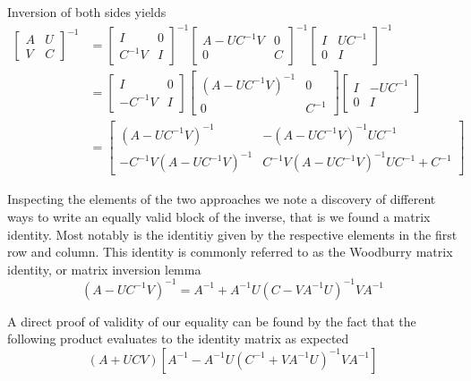 \documentclass{article}
\begin{document}
Inversion of both sides yields
\begin{align*}
\left[ \begin{array}{cc}{A} & {U} \\ {V} & {C}\end{array}\right]^{-1}&=\left[ \begin{array}{cc}{I} & {0} \\ {C^{-1} V} & {I}\end{array}\right]^{-1} \left[ \begin{array}{cc}{A-U C^{-1} V} & {0} \\ {0} & {C}\end{array}\right]^{-1} \left[ \begin{array}{cc}{I} & {U C^{-1}} \\ {0} & {I}\end{array}\right]^{-1} \\
&=\left[ \begin{array}{cc}{I} & {0} \\ {-C^{-1} V} & {I}\end{array}\right] \left[ \begin{array}{cc}{\left(A-U C^{-1} V\right)^{-1}} & {0} \\ {0} & {C^{-1}}\end{array}\right] \left[ \begin{array}{cc}{I} & {-U C^{-1}} \\ {0} & {I}\end{array}\right] \\
&=\left[ \begin{array}{cc}{\left(A-U C^{-1} V\right)^{-1}} & {-\left(A-U C^{-1} V\right)^{-1} U C^{-1}} \\ {-C^{-1} V\left(A-U C^{-1} V\right)^{-1}} & {C^{-1} V\left(A-U C^{-1} V\right)^{-1} U C^{-1}+C^{-1}}\end{array}\right]
\end{align*}

Inspecting the elements of the two approaches we note a discovery of different ways to write an equally valid block of the inverse, that is we found a matrix identity. Most notably is the identitiy given by the respective elements in the first row and column. This identity is commonly referred to as the Woodburry matrix identity, or matrix inversion lemma
$$\left(A-U C^{-1} V\right)^{-1}=A^{-1}+A^{-1} U\left(C-V A^{-1} U\right)^{-1} V A^{-1}$$

A direct proof of validity of our equality can be found by the fact that the following product evaluates to the identity matrix as expected
$$(A+U C V)\left[A^{-1}-A^{-1} U\left(C^{-1}+V A^{-1} U\right)^{-1} V A^{-1}\right]$$
\end{document}
